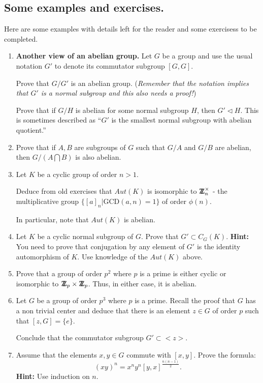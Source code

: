 \documentclass[12pt]{article}
\def\DZ{ \mbox{\rm Z \kern -0.75em Z} }
\begin{document}
\subsection{Some examples and exercises.}
Here are some examples with details left for the reader and some
exercisess to be completed.
\begin{enumerate}
\item {\bf Another view of an abelian group.} Let $G$ be a group and use
the usual notation $G'$ to denote its commutator subgroup $[G,G]$.

Prove that $G/G'$ is an abelian group. ({\it Remember that the notation
implies that $G'$ is a normal subgroup and this also needs a proof!})

Prove that if $G/H$ is abelian for some normal subgroup $H$, then
$G' \triangleleft H$. This is sometimes described as ``$G'$ is  the
smallest normal subgroup with abelian quotient.''

\item Prove that if $A,B$ are subgroups of $G$ such that $G/A$ and $G/B$
are abelian, then $G/(A\bigcap B)$ is also abelian.

\item Let $K$ be a cyclic group of order $n>1$.

Deduce from old exercises that $Aut(K)$ is isomorphic to $\DZ_n^\times$
- the multiplicative  group $\{[a]_n|\mbox{GCD}(a,n)=1\}$ of order $\phi(n)$.

In particular, note that $Aut(K)$ is abelian.

\item Let $K$ be a cyclic normal subgroup of $G$.
Prove that $G' \subset C_G(K)$.
{\bf Hint:} You need to prove that conjugation by any element of $G'$
is the identity automorphism of $K$. Use knowledge of the $Aut(K)$
above.


\item Prove that a group of order $p^2$ where $p$ is a prime is either
cyclic or isomorphic to $\DZ_p\times \DZ_p$. Thus, in either case, it is
abelian.

\item Let $G$ be a group of order $p^3$ where $p$ is a prime.
Recall the proof that $G$ has a non trivial center and deduce that there
is an element $z\in G$ of order $p$ such that $[z,G]=\{e\}.$

Conclude that the commutator subgroup $G'\subset <z>$.

\item Assume that the elements $x,y\in G$ commute with $[x,y]$.
Prove the formula:
$$(xy)^n = x^ny^n[y,x]^{\frac{n(n-1)}{2}}.$$
{\bf Hint:} Use induction on $n$.



\end{enumerate}
\end{document}
